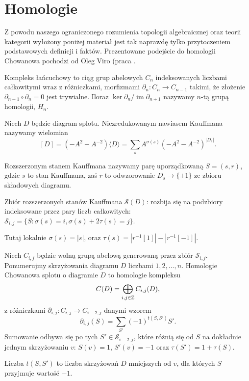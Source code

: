 \section{Homologie} %
\label{sec:homology}
Z powodu naszego ograniczonego rozumienia topologii algebraicznej oraz teorii kategorii
wyłożony poniżej materiał jest tak naprawdę tylko przytoczeniem podstawowych definicji i faktów.
Prezentowane podejście do homologii Chowanowa pochodzi od Oleg Viro (praca \cite{viro04}.

Kompleks łańcuchowy to ciąg grup abelowych $C_n$ indeksowanych liczbami całkowitymi
wraz z różniczkami, morfizmami $\partial_n \colon C_n \to C_{n-1}$ takimi,
że złożenie $\partial_{n-1} \circ \partial_n = 0$ jest trywialne.
Iloraz $\ker \partial_n / \operatorname{im} \partial_{n+1}$ nazywamy $n$-tą grupą homologii, $H_n$.


\begin{definition}
	Niech $D$ będzie diagram splotu.
	Niezredukowanym nawiasem Kauffmana nazywamy wielomian
	\[
		[D] = (-A^2 - A^{-2}) \langle D \rangle = \sum_s A^{\sigma(s)} (-A^2 - A^{-2})^{|D_s|}.
	\]
\end{definition}

\begin{definition}
	Rozszerzonym stanem Kauffmana nazywamy parę uporządkowaną $S = (s, r)$,
	gdzie $s$ to stan Kauffmana,
	zaś $r$ to odwzorowanie $D_s \to \{\pm 1\}$ ze zbioru składowych diagramu.
\end{definition}

\begin{definition}
	Zbiór rozszerzonych stanów Kauffmana $\mathcal S(D)$:
	rozbija się na podzbiory indeksowane przez pary liczb całkowitych:
	$\mathcal S_{i, j} = \{S : \sigma(s) = i, \sigma(s) + 2 \tau(s) = j\}$.
\end{definition}

Tutaj lokalnie $\sigma(s) = |s|$, oraz $\tau(s) = |r^{-1}[1]| - |r^{-1}[-1]|$.


\begin{definition}
	Niech $C_{i, j}$ będzie wolną grupą abelową generowaną przez zbiór $\mathcal S_{i, j}$.
	Ponumerujmy skrzyżowania diagramu $D$ liczbami $1, 2, \ldots, n$.
	Homologie Chowanowa splotu o diagramie $D$ to homologie kompleksu
	\[
		C(D) = \bigoplus_{i, j \in \mathbb Z} C_{i, j}(D),
	\]
	z różniczkami $\partial_{i, j} \colon C_{i,j} \to C_{i-2, j}$ danymi wzorem
	\[
		\partial_{i, j}(S) = \sum_{S'} (-1)^{t(S, S')}  S'.
	\]
	Sumowanie odbywa się po tych $S' \in \mathcal S_{i-2, j}$,
	które różnią się od $S$ na dokładnie jednym skrzyżowaniu $v$:
	$S(v) = 1$, $S'(v) = -1$ oraz $\tau(S') = 1 + \tau (S)$.

	Liczba $t(S, S')$ to liczba skrzyżowań $D$ mniejszych od $v$, dla których $S$ przyjmuje wartość $-1$.
\end{definition}

